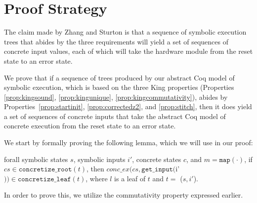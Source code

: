 \section{Proof Strategy}
The claim made by Zhang and Sturton is that a sequence of symbolic execution
trees that abides by the three requirements will yield a set of sequences of concrete
input values, each of which will take the hardware module from the reset state to an
error state.

We prove that if a sequence of trees produced by our abstract Coq model of symbolic
execution, which is based on the three King properties (Properties
\ref{prop:kingsound}, \ref{prop:kingunique}, \ref{prop:kingcommutativity}), abides by
Properties~\ref{prop:startinit}, \ref{prop:correctedz2}, and \ref{prop:stitch}, then
it does yield a set of sequences of concrete inputs that take the abstract Coq model of
concrete execution from the reset state to an error state.


We start by formally proving the following lemma, which we will use in our proof:
\begin{lemma} \label{cop}
forall symbolic states $s$, symbolic inputs $i'$, concrete states $c$, and $m = \mathtt{map(\cdot)}$,
if $cs \in \mathtt{concretize\_root}(t)$,
then 
$conc\_ex(cs, \mathtt{get\_input} ($i'$)) \in \mathtt{concretize\_leaf}(t)$,
where $l$ is a leaf of $t$ and $t = $ \symexecution($s, i'$).
\end{lemma}

 In order to prove this, we utilize the commutativity property expressed earlier.






